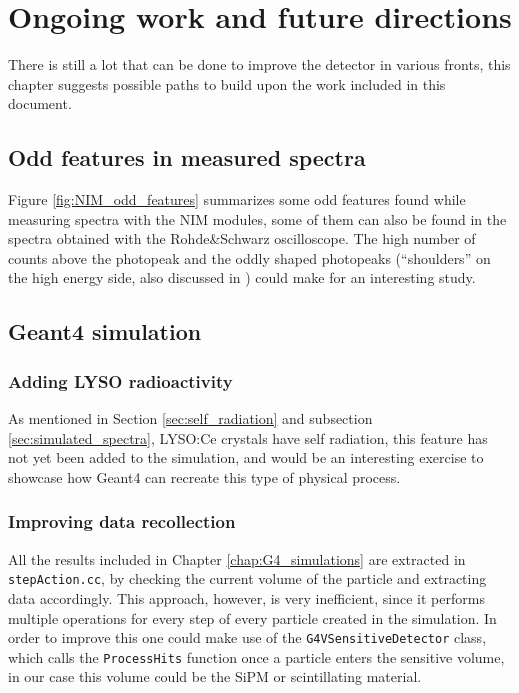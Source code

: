 \chapter{Ongoing work and future directions}

There is still a lot that can be done to improve the detector in various fronts, this chapter suggests possible paths to build upon the work included in this document.

\section{Odd features in measured spectra}

Figure \ref{fig:NIM_odd_features} summarizes some odd features found while measuring spectra with the NIM modules, some of them can also be found in the spectra obtained with the Rohde\&Schwarz oscilloscope. The high number of counts above the photopeak and the oddly shaped photopeaks (``shoulders'' on the high energy side, also discussed in \cite{peak_shoulders}) could make for an interesting study.

\section{Geant4 simulation}

\subsection{Adding LYSO radioactivity}

As mentioned in Section \ref{sec:self_radiation} and subsection \ref{sec:simulated_spectra}, LYSO:Ce crystals have self radiation, this feature has not yet been added to the simulation, and would be an interesting exercise to showcase how Geant4 can recreate this type of physical process.

\subsection{Improving data recollection}

All the results included in Chapter \ref{chap:G4_simulations} are extracted in \texttt{stepAction.cc}, by checking the current volume of the particle and extracting data accordingly. This approach, however, is very inefficient, since it performs multiple operations for every step of every particle created in the simulation. In order to improve this one could make use of the \texttt{G4VSensitiveDetector} class, which calls the \texttt{ProcessHits} function once a particle enters the sensitive volume, in our case this volume could be the SiPM or scintillating material.

